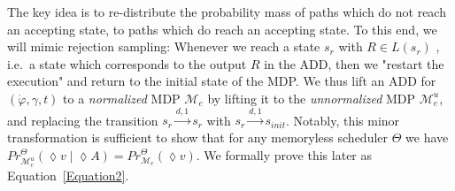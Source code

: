 	The key idea is to re-distribute the probability mass of paths which do not reach an accepting state, to paths which do reach an accepting state.
	To this end, we will mimic rejection sampling: 
	Whenever we reach a state $s_r$ with $R\in L(s_r)$ , i.e.\ a state which corresponds to the output $R$ in the ADD, then we "restart the execution" and return to the initial state of the MDP.
	We thus lift an ADD for $(\dot{\varphi}, \gamma, t)$ to a \textit{normalized} MDP $\mathcal{M}_e$ by lifting it to the \textit{unnormalized} MDP $\mathcal{M}^u_e$, and replacing the transition $s_r \xrightarrow{d, 1} s_r$ with $s_r \xrightarrow{d, 1} s_{init}$.
	Notably, this minor transformation is sufficient to show that for any memoryless scheduler $\Theta$ we have $Pr^{\Theta}_{\mathcal{M}^u_e} (\lozenge v \;|\; \lozenge A) = Pr^{\Theta}_{\mathcal{M}_e} (\lozenge v)$. 
	We formally prove this later as Equation~\ref{Equation2}.




